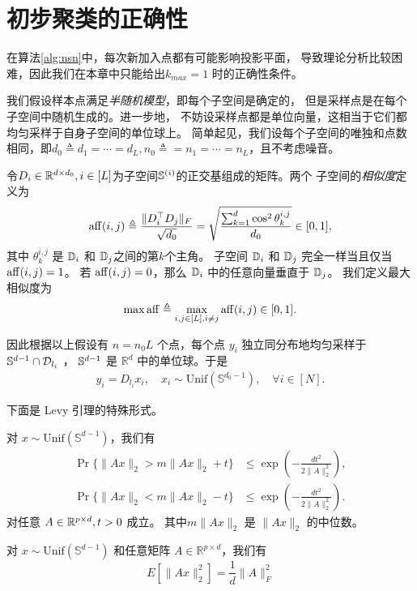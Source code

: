 \documentclass[main]{subfiles}
\begin{document}
\chapter{初步聚类的正确性}\label{chp:greedy}
在算法\ref{alg:nsn}中，每次新加入点都有可能影响投影平面，
导致理论分析比较困难，因此我们在本章中只能给出$k_{max}=1$
时的正确性条件。

我们假设样本点满足\emph{半随机模型}，即每个子空间是确定的，
但是采样点是在每个子空间中随机生成的。进一步地，
不妨设采样点都是单位向量，这相当于它们都均匀采样于自身子空间的单位球上。
简单起见，我们设每个子空间的唯独和点数相同，即$d_0\triangleq d_1=\cdots=d_L,
n_0\triangleq = n_1=\cdots=n_L$，且不考虑噪音。

令$D_i\in \R^{d\times d_0}, i\in [L]$为子空间$\S^{(i)}$的正交基组成的矩阵。两个
子空间的\emph{相似度}定义为
\begin{align*}
  \aff(i,j) \triangleq \frac{\|D_i^\top D_j\|_F}{\sqrt{d_0}} =
  \sqrt{\frac{\sum_{k=1}^{d} \cos^2 \theta^{i,j}_k}{d_0}} \in [0,1],
\end{align*}
其中 $\theta^{i,j}_k$ 是 $\D_i$ 和 $\D_j$之间的第$k$个主角。
子空间 $\D_i$ 和 $\D_j$ 完全一样当且仅当 $\aff(i,j) = 1$。
若 $\aff(i,j) = 0$，那么 $\D_i$ 中的任意向量垂直于 $\D_j$。
我们定义最大相似度为
$$ \max \aff \triangleq \max_{i,j \in [L], i \neq j} \aff(i,j) \in [0,1].$$

因此根据以上假设有 $n = n_0 L$ 个点，每个点 $y_i$ 独立同分布地均匀采样于
$\S^{d-1} \cap \set{D}_{l_i}$ ， $\S^{d-1}$ 是 $\mathbb{R}^d$ 中的单位球。于是
\begin{align*}
  y_i = D_{l_i} x_i ,\quad x_i \sim \text{Unif}(\mathbb{S}^{d_0-1}) ,\quad
  \forall i \in [N].
\end{align*}

下面是 Levy 引理的特殊形式。
\begin{lemma} \label{lem:measureconc}
对 $x \sim \text{Unif}(\mathbb{S}^{d-1})$，我们有
\begin{align*} 
\Pr \{ \| A x \|_2  > m\|A x\|_2 + t \} &\le \exp \left( - \frac{dt^2}{2\|A\|_2^2} \right), \\
\Pr \{ \| A x \|_2  < m\|A x\|_2 - t \} &\le \exp \left( - \frac{dt^2}{2\|A\|_2^2} \right).
\end{align*}
对任意 $A \in \R^{p \times d}, t > 0$ 成立。 其中$m\|Ax\|_2$ 是 $\|Ax\|_2$ 的中位数。
\end{lemma}

\begin{lemma} \label{lem:expectation}
  对 $x \sim \text{Unif}(\mathbb{S}^{d-1})$ 和任意矩阵 
  $A \in \mathbb{R}^{p \times d}$，我们有
  $$ E[\|Ax\|_2^2] = \frac{1}{d} \|A\|_F^2 $$
\end{lemma}
\end{document}
